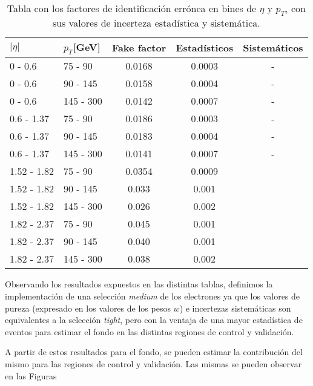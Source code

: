 \begin{table}	
\centering
\begin{threeparttable}
\caption{Tabla con los factores de identificación errónea en bines de $\eta$ y $p_{T}$, con sus valores de incerteza estadística y sistemática.}
\begin{tabular}{ l l c c c }

	\hline
	\hline

	$|\eta|$ & $p_{T}$[GeV] & Fake factor & Estadísticos & Sistemáticos \\

	\hline

	0 - 0.6 & 75 - 90 & 0.0168 & 0.0003 & -		 \\

	0 - 0.6 & 90 - 145 & 0.0158 & 0.0004 & - 	 \\

	0 - 0.6 & 145 - 300 & 0.0142 & 0.0007 & -  	 \\

	\hline

	0.6 - 1.37 & 75 - 90 & 0.0186 & 0.0003 & -	 \\

	0.6 - 1.37 & 90 - 145 & 0.0183 & 0.0004 & -	 \\

	0.6 - 1.37 & 145 - 300 & 0.0141 & 0.0007 & -   \\

	\hline

	1.52 - 1.82 & 75 - 90 & 0.0354  & 0.0009 &  \\

	1.52 - 1.82 & 90 - 145 & 0.033  & 0.001 & \\

	1.52 - 1.82 & 145 - 300 & 0.026  & 0.002 & \\

	\hline

	1.82 - 2.37 & 75 - 90 & 0.045  & 0.001 &  \\

	1.82 - 2.37 & 90 - 145 & 0.040  & 0.001 &  \\

	1.82 - 2.37 & 145 - 300 & 0.038  & 0.002 & \\

	\hline
	\hline

\end{tabular}
\label{ta:fftable}
\end{threeparttable}
\end{table}

Observando los resultados expuestos en las distintas tablas, definimos la implementación de una selección \textit{medium} de los electrones ya que los valores de pureza (expresado en los valores de los pesos $w$) e incertezas sistemáticas son equivalentes a la selección \textit{tight}, pero con la ventaja de una mayor estadística de eventos para estimar el fondo en las distintas regiones de control y validación.

A partir de estos resultados para el fondo, se pueden estimar la contribución del mismo para las regiones de control y validación. Las mismas se pueden observar en las Figuras 
